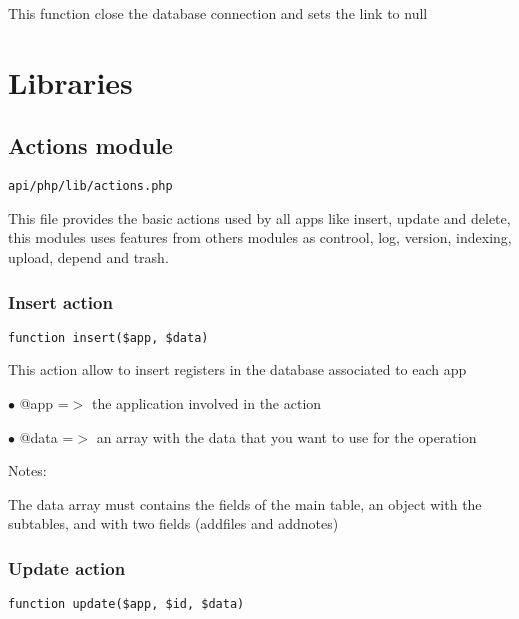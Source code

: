 \documentclass[a4paper]{article}
\begin{document}
This function close the database connection and sets the link to null


\hypertarget{toc362}{}
\section{Libraries}

\hypertarget{toc363}{}
\subsection{Actions module}

\begin{lstlisting}
api/php/lib/actions.php
\end{lstlisting}

This file provides the basic actions used by all apps like insert,
update and delete, this modules uses features from others modules
as controol, log, version, indexing, upload, depend and trash.

\hypertarget{toc364}{}
\subsubsection{Insert action}

\begin{lstlisting}
function insert($app, $data)
\end{lstlisting}

This action allow to insert registers in the database associated to
each app

\begin{compactitem}
\item[\color{myblue}$\bullet$] @app  =$>$ the application involved in the action
\item[\color{myblue}$\bullet$] @data =$>$ an array with the data that you want to use for the operation
\end{compactitem}

Notes:

The data array must contains the fields of the main table, an object
with the subtables, and with two fields (addfiles and addnotes)

\hypertarget{toc365}{}
\subsubsection{Update action}

\begin{lstlisting}
function update($app, $id, $data)
\end{lstlisting}
\end{document}
